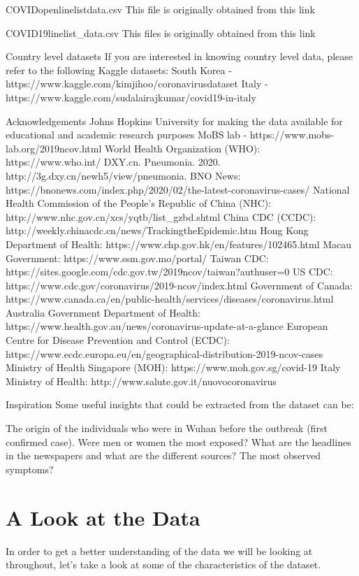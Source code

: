 \documentclass[11pt]{article}
\begin{document}
COVIDopenlinelistdata.csv
This file is originally obtained from this link

COVID19linelist_data.csv
This files is originally obtained from this link

Country level datasets
If you are interested in knowing country level data, please refer to the following Kaggle datasets:
South Korea - https://www.kaggle.com/kimjihoo/coronavirusdataset
Italy -
https://www.kaggle.com/sudalairajkumar/covid19-in-italy

Acknowledgements
Johns Hopkins University for making the data available for educational and academic research purposes
MoBS lab - https://www.mobs-lab.org/2019ncov.html
World Health Organization (WHO): https://www.who.int/
DXY.cn. Pneumonia. 2020. http://3g.dxy.cn/newh5/view/pneumonia.
BNO News: https://bnonews.com/index.php/2020/02/the-latest-coronavirus-cases/
National Health Commission of the People’s Republic of China (NHC):
http://www.nhc.gov.cn/xcs/yqtb/list_gzbd.shtml
China CDC (CCDC): http://weekly.chinacdc.cn/news/TrackingtheEpidemic.htm
Hong Kong Department of Health: https://www.chp.gov.hk/en/features/102465.html
Macau Government: https://www.ssm.gov.mo/portal/
Taiwan CDC: https://sites.google.com/cdc.gov.tw/2019ncov/taiwan?authuser=0
US CDC: https://www.cdc.gov/coronavirus/2019-ncov/index.html
Government of Canada: https://www.canada.ca/en/public-health/services/diseases/coronavirus.html
Australia Government Department of Health: https://www.health.gov.au/news/coronavirus-update-at-a-glance
European Centre for Disease Prevention and Control (ECDC): https://www.ecdc.europa.eu/en/geographical-distribution-2019-ncov-cases
Ministry of Health Singapore (MOH): https://www.moh.gov.sg/covid-19
Italy Ministry of Health: http://www.salute.gov.it/nuovocoronavirus

Inspiration
Some useful insights that could be extracted from the dataset can be:

The origin of the individuals who were in Wuhan before the outbreak (first confirmed case).
Were men or women the most exposed?
What are the headlines in the newspapers and what are the different sources?
The most observed symptoms?
    \section{A Look at the Data}\label{a-look-at-the-data}

In order to get a better understanding of the data we will be looking at
throughout, let's take a look at some of the characteristics of the
dataset.
\end{document}
